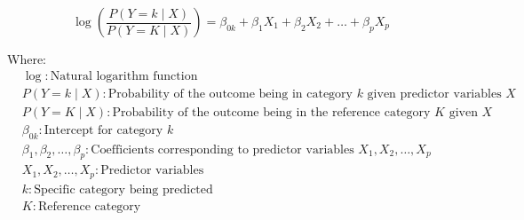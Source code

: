 \begin{equation}\label{eq:multinom_regression}
    \log\left(\frac{{P(Y = k \mid X)}}{{P(Y = K \mid X)}}\right) = \beta_{0k} + \beta_1 X_1 + \beta_2 X_2 + \dots + \beta_p X_p
\end{equation}

Where:
\begin{align*}
    & \log: \text{Natural logarithm function} \\
    & P(Y = k \mid X): \text{Probability of the outcome being in category \(k\) given predictor variables \(X\)} \\
    & P(Y = K \mid X): \text{Probability of the outcome being in the reference category \(K\) given \(X\)} \\
    & \beta_{0k}: \text{Intercept for category \(k\)} \\
    & \beta_1, \beta_2, \dots, \beta_p: \text{Coefficients corresponding to predictor variables \(X_1, X_2, \dots, X_p\)} \\
    & X_1, X_2, \dots, X_p: \text{Predictor variables} \\
    & k: \text{Specific category being predicted} \\
    & K: \text{Reference category}
\end{align*}



\endinput